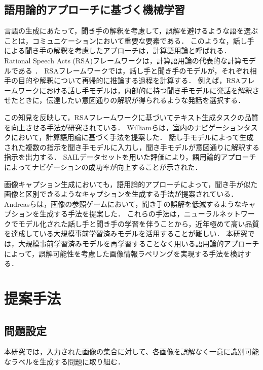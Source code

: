 \documentclass[a4paper,11pt]{jreport}
\begin{document}
\section{語用論的アプローチに基づく機械学習}
\label{sec:relwork_pragmatic_ml}
言語の生成にあたって，聞き手の解釈を考慮して，誤解を避けるような語を選ぶことは，コミュニケーションにおいて重要な要素である．
このような，話し手による聞き手の解釈を考慮したアプローチは，計算語用論と呼ばれる\cite{Fried2023}．
Rational Speech Acts (RSA)フレームワークは，計算語用論の代表的な計算モデルである \cite{Frank2012,Goodman2016}．
RSAフレームワークでは，話し手と聞き手のモデルが，それぞれ相手の目的や解釈について再帰的に推論する過程を計算する．
例えば，RSAフレームワークにおける話し手モデルは，内部的に持つ聞き手モデルに発話を解釈させたときに，伝達したい意図通りの解釈が得られるような発話を選択する．

この知見を反映して，RSAフレームワークに基づいてテキスト生成タスクの品質を向上させる手法が研究されている\cite{Fried2017}．
Williamら\cite{Williams2015}は，室内のナビゲーションタスクにおいて，計算語用論に基づく手法を提案した．
話し手モデルによって生成された複数の指示を聞き手モデルに入力し，聞き手モデルが意図通りに解釈する指示を出力する．
SAILデータセットを用いた評価により，語用論的アプローチによってナビゲーションの成功率が向上することが示された．

画像キャプション生成においても，語用論的アプローチによって，聞き手が似た画像と区別できるようなキャプションを生成する手法が提案されている\cite{Vedantam2017,Cohn-Gordon2018,Nie2020}．
Andreasら\cite{Andreas2016}は，画像の参照ゲームにおいて，聞き手の誤解を低減するようなキャプションを生成する手法を提案した．
これらの手法は，ニューラルネットワークでモデル化された話し手と聞き手の学習を伴うことから，近年極めて高い品質を達成している大規模事前学習済みモデルを活用することが難しい．
本研究では，大規模事前学習済みモデルを再学習することなく用いる語用論的アプローチによって，誤解可能性を考慮した画像情報ラベリングを実現する手法を検討する．

\chapter{提案手法}

\section{問題設定}

本研究では，入力された画像の集合に対して、各画像を誤解なく一意に識別可能なラベルを生成する問題に取り組む．
\end{document}
